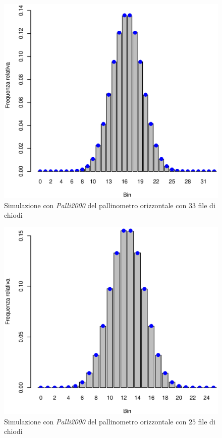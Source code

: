\documentclass[10pt,oneside,a4paper]{article}
\begin{document}
\begin{figure}[H]
\caption{Simulazione con \emph{Palli2000} del pallinometro orizzontale con $33$ file di chiodi}
\label{fig:palli2000_orizzontale_33}
\centering
\includegraphics[scale=0.5]{palli2000_orizz_1.eps}
\end{figure}
\begin{figure}[H]
\caption{Simulazione con \emph{Palli2000} del pallinometro orizzontale con $25$ file di chiodi}
\label{fig:palli2000_orizzontale_25}
\centering
\includegraphics[scale=0.5]{palli2000_orizz_2.eps}
\end{figure}
\end{document}
